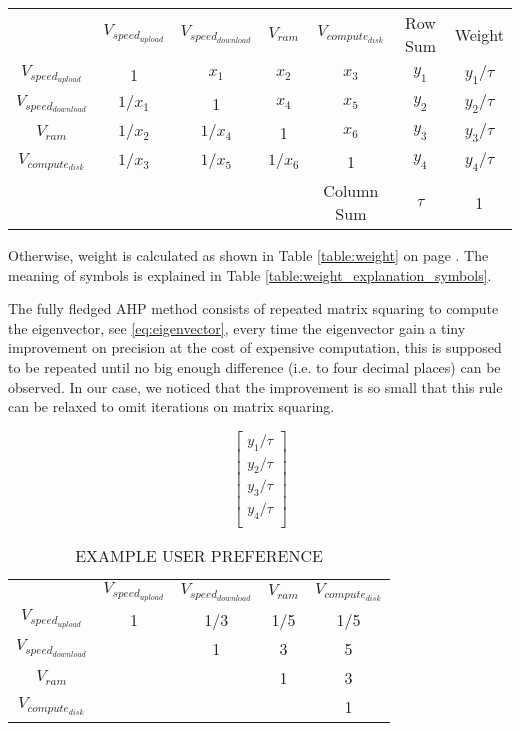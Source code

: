 \documentclass[journal]{IEEEtran}
\begin{document}
\begin{table*}
\begin{center}
\caption{MATRIX ILLUSTRATING HOW TO TURN PAIR-WISE PREFERENCE INTO GLOBAL WEIGHT}
\label{table:weight}
\begin{tabular}{ccccccc}
& $V_{speed_{upload}}$ & $V_{speed_{download}}$ & $V_{ram}$ & $V_{compute_{disk}}$ & Row Sum & Weight \\
$V_{speed_{upload}}$ & 1 & ${x_{1}}$ & ${x_{2}}$ & ${x_{3}}$ & ${y_{1}}$ & ${y_1}/\tau$  \\
$V_{speed_{download}}$ & $1/{x_1}$ & 1  & ${x_{4}}$ & ${x_{5}}$ & ${y_{2}}$ & ${y_2}/\tau$  \\
$V_{ram}$ & $1/{x_2}$ & $1/{x_4}$ & 1 & ${x_{6}}$ & ${y_{3}}$ & ${y_3}/\tau$ \\
$V_{compute_{disk}}$ & $1/{x_3}$ & $1/{x_5}$ & $1/{x_{6}}$ & 1 & ${y_{4}}$ & ${y_4}/\tau$ \\
& & & & Column Sum & $\tau$ & 1\\
\end{tabular}
\end{center}
\end{table*}


Otherwise, weight is calculated as shown in Table \ref{table:weight} on page \pageref{table:weight}. 
The meaning of symbols is explained in Table \ref{table:weight_explanation_symbols}.
 
The fully fledged AHP method consists of repeated matrix squaring to compute the eigenvector, see \ref{eq:eigenvector}, every time the eigenvector gain a tiny improvement on precision at the cost of expensive computation, this is supposed to be repeated until no big enough difference (i.e. to four decimal places)  can be observed. In our case, we noticed that the improvement is so small that this rule can be relaxed to omit iterations on matrix squaring.

\begin{equation}\label{eq:eigenvector}
\left[ \begin{array}{l}
{y_1}/\tau \\
{y_2}/\tau \\
{y_3}/\tau \\
{y_4}/\tau \\
\end{array} \right]
\end{equation}


\begin{table}
\caption{EXAMPLE USER PREFERENCE}
\label{table:weight_example}
\begin{tabular}{@{}c@{}c@{}c@{}c@{}c@{}}
& $V_{speed_{upload}}$ & $V_{speed_{download}}$ & $V_{ram}$ & $V_{compute_{disk}}$ \\
$V_{speed_{upload}}$ & 1 & 1/3 & 1/5 & 1/5 \\
$V_{speed_{download}}$ & & 1 & 3 & 5 \\
$V_{ram}$ & & & 1 & 3 \\
$V_{compute_{disk}}$ & & & & 1 \\
\end{tabular}
\end{table}
\end{document}
